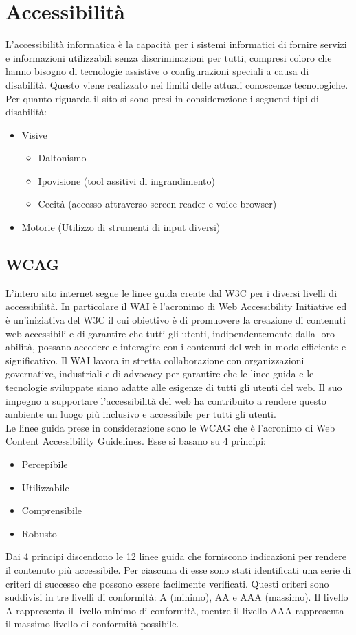 \documentclass[a4paper,final,12pt]{report}
\begin{document}
\section{Accessibilità}
L'accessibilità informatica è la capacità per i sistemi informatici di fornire servizi e informazioni utilizzabili senza discriminazioni per tutti, compresi coloro che hanno bisogno di tecnologie assistive o configurazioni speciali a causa di disabilità. Questo viene realizzato nei limiti delle attuali conoscenze tecnologiche. Per quanto riguarda il sito si sono presi in considerazione i seguenti tipi di disabilità:
\begin{itemize}
\item Visive
\begin{itemize}
\item Daltonismo
\item Ipovisione (tool assitivi di ingrandimento)
\item Cecità (accesso attraverso screen reader e voice browser)
\end{itemize}
\item Motorie (Utilizzo di strumenti di input diversi)
\end{itemize}

\subsection{WCAG}
L'intero sito internet segue le linee guida create dal W3C per i diversi livelli di accessibilità.
In particolare il WAI è l'acronimo di Web Accessibility Initiative ed è un'iniziativa del W3C il cui obiettivo è di promuovere la creazione di contenuti web accessibili e di garantire che tutti gli utenti, indipendentemente dalla loro abilità, possano accedere e interagire con i contenuti del web in modo efficiente e significativo. Il WAI lavora in stretta collaborazione con organizzazioni governative, industriali e di advocacy per garantire che le linee guida e le tecnologie sviluppate siano adatte alle esigenze di tutti gli utenti del web. Il suo impegno a supportare l'accessibilità del web ha contribuito a rendere questo ambiente un luogo più inclusivo e accessibile per tutti gli utenti.\\
Le linee guida prese in considerazione sono le WCAG che è l'acronimo di Web Content Accessibility Guidelines.
Esse si basano su 4 principi:
\begin{itemize}
\item Percepibile
\item Utilizzabile
\item Comprensibile
\item Robusto
\end{itemize}
Dai 4 principi discendono le 12 linee guida che
forniscono indicazioni per rendere il contenuto più accessibile. Per ciascuna di esse sono stati identificati una serie di criteri di successo che possono essere facilmente verificati. Questi criteri sono suddivisi in tre livelli di conformità: A (minimo), AA e AAA (massimo). Il livello A rappresenta il livello minimo di conformità, mentre il livello AAA rappresenta il massimo livello di conformità possibile.
\end{document}

